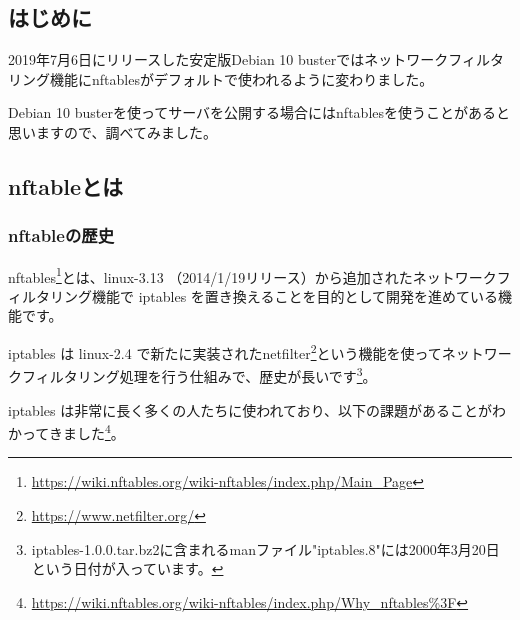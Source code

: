 \documentclass[mingoth,a4paper]{jsarticle}
\begin{document}
%
%
%
%




\subsection{はじめに}

2019年7月6日にリリースした安定版Debian 10 busterではネットワークフィルタリング機能にnftablesがデフォルトで使われるように変わりました。

Debian 10 busterを使ってサーバを公開する場合にはnftablesを使うことがあると思いますので、調べてみました。


\subsection{nftableとは}

\subsubsection{nftableの歴史}

nftables\footnote{\url{https://wiki.nftables.org/wiki-nftables/index.php/Main_Page}}とは、linux-3.13 （2014/1/19リリース）から追加されたネットワークフィルタリング機能で iptables を置き換えることを目的として開発を進めている機能です。

iptables は linux-2.4 で新たに実装されたnetfilter\footnote{\url{https://www.netfilter.org/}}という機能を使ってネットワークフィルタリング処理を行う仕組みで、歴史が長いです\footnote{iptables-1.0.0.tar.bz2に含まれるmanファイル"iptables.8"には2000年3月20日という日付が入っています。}。

iptables は非常に長く多くの人たちに使われており、以下の課題があることがわかってきました\footnote{\url{https://wiki.nftables.org/wiki-nftables/index.php/Why_nftables\%3F}}。
\end{document}
